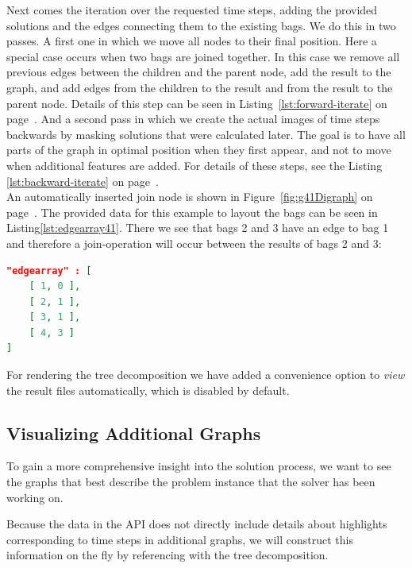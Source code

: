 \documentclass[a4paper, 12pt, bibliography=totoc]{scrartcl}
\begin{document}
Next comes the iteration over the requested time steps, adding the provided solutions and the edges connecting them to the existing bags. We do this in two passes.  A first one in which we move all nodes to their final position. Here a special case occurs when two bags are joined together.
In this case we remove all previous edges between the children and the parent node, add the result to the graph, and add edges from the children to the result and from the result to the parent node. Details of this step can be seen in Listing~\ref{lst:forward-iterate} on page~\pageref{lst:forward-iterate}. And a second pass in which we create the actual images of time steps backwards by masking solutions that were calculated later. The goal is to have all parts of the graph in optimal position when they first appear, and not to move when additional features are added. For details of these steps, see the Listing \ref{lst:backward-iterate} on page~\pageref{lst:backward-iterate}.\\

An automatically inserted join node is shown in Figure~\ref{fig:g41Digraph} on page~\pageref{fig:g41Digraph}.
The provided data for this example to layout the bags can be seen in Listing\ref{lst:edgearray41}. There we see that bags 2 and 3 have an edge to bag 1 and therefore a join-operation will occur between the results of bags 2 and 3:

\begin{lstlisting}[language=json,caption={Structure provided for bags of example \ref{fig:g41Digraph} },xleftmargin=5.5cm,xrightmargin=5.8cm,label={lst:edgearray41}]
"edgearray" : [
	[ 1, 0 ],
	[ 2, 1 ],
	[ 3, 1 ],
	[ 4, 3 ]
]
\end{lstlisting}
\noindent
For rendering the tree decomposition we have added a convenience option to \textit{view} the result files automatically, which is disabled by default.

\subsection{Visualizing Additional Graphs}
To gain a more comprehensive insight into the solution process, we want to see the graphs that best describe the problem instance that the solver has been working on.

Because the data in the API does not directly include details about highlights corresponding to time steps in additional graphs, we will construct this information on the fly by referencing with the tree decomposition.
\end{document}

